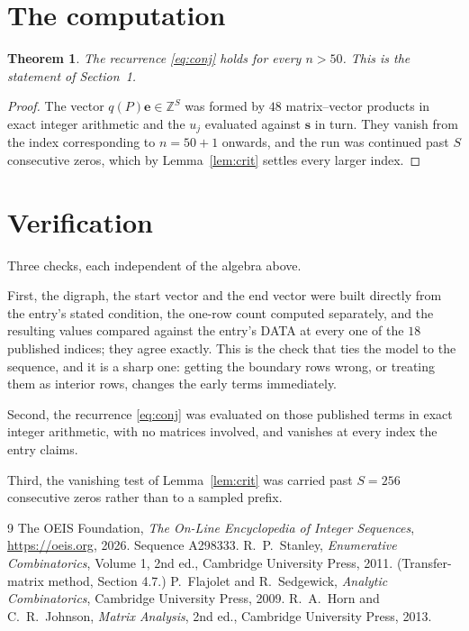 \documentclass[11pt,a4paper]{article}
\theoremstyle{plain}
\newtheorem{theorem}{Theorem}
\theoremstyle{definition}
\begin{document}
\section{The computation}

\begin{theorem}
The recurrence \eqref{eq:conj} holds for every $n>50$. This is the statement of
Section~1.
\end{theorem}

\begin{proof}
The vector $q(P)\mathbf{e}\in\mathbb{Z}^{S}$ was formed by $48$ matrix--vector
products in exact integer arithmetic and the $u_j$ evaluated against $\mathbf{s}$ in turn.
They vanish from the index corresponding to $n=50+1$ onwards, and the run was continued
past $S$ consecutive zeros, which by Lemma~\ref{lem:crit} settles every larger index.
\end{proof}

\section{Verification}

Three checks, each independent of the algebra above.

First, the digraph, the start vector and the end vector were built directly from the
entry's stated condition, the one-row count computed separately, and the resulting values
compared against the entry's DATA at every one of the $18$ published indices; they
agree exactly. This is the check that ties the model to the sequence, and it is a sharp one:
getting the boundary rows wrong, or treating them as interior rows, changes the early terms
immediately.

Second, the recurrence \eqref{eq:conj} was evaluated on those published terms in exact
integer arithmetic, with no matrices involved, and vanishes at every index the entry claims.

Third, the vanishing test of Lemma~\ref{lem:crit} was carried past $S=256$ consecutive
zeros rather than to a sampled prefix.

\begin{thebibliography}{9}
 The OEIS Foundation, \emph{The On-Line Encyclopedia of Integer
Sequences}, \url{https://oeis.org}, 2026. Sequence A298333.
 R.~P.~Stanley, \emph{Enumerative Combinatorics}, Volume 1, 2nd ed.,
Cambridge University Press, 2011. (Transfer-matrix method, Section 4.7.)
 P.~Flajolet and R.~Sedgewick, \emph{Analytic Combinatorics}, Cambridge
University Press, 2009.
 R.~A.~Horn and C.~R.~Johnson, \emph{Matrix Analysis}, 2nd ed., Cambridge
University Press, 2013.
\end{thebibliography}
\end{document}
